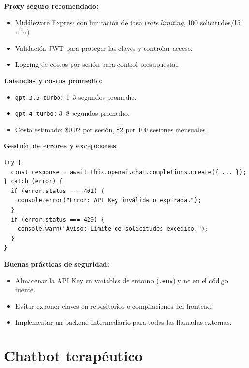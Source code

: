\documentclass[12pt,a4paper]{report}
\numberwithin{figure}{section}
\begin{document}
\vspace{0.5em}
\noindent \textbf{Proxy seguro recomendado:}
\begin{itemize}
  \item Middleware Express con limitación de tasa (\textit{rate limiting}, 100 solicitudes/15 min).
  \item Validación JWT para proteger las claves y controlar acceso.
  \item Logging de costos por sesión para control presupuestal.
\end{itemize}

\vspace{0.5em}
\noindent \textbf{Latencias y costos promedio:}
\begin{itemize}
  \item \texttt{gpt-3.5-turbo:} 1–3 segundos promedio.
  \item \texttt{gpt-4-turbo:} 3–8 segundos promedio.
  \item Costo estimado: \$0.02 por sesión, \$2 por 100 sesiones mensuales.
\end{itemize}

\vspace{0.5em}
\noindent \textbf{Gestión de errores y excepciones:}
\begin{lstlisting}[style=angelcode,caption={Manejo de errores comunes en la conexión con OpenAI}]
try {
  const response = await this.openai.chat.completions.create({ ... });
} catch (error) {
  if (error.status === 401) {
    console.error("Error: API Key inválida o expirada.");
  }
  if (error.status === 429) {
    console.warn("Aviso: Límite de solicitudes excedido.");
  }
}
\end{lstlisting}

\vspace{0.5em}
\noindent \textbf{Buenas prácticas de seguridad:}
\begin{itemize}
  \item Almacenar la API Key en variables de entorno (\texttt{.env}) y no en el código fuente.
  \item Evitar exponer claves en repositorios o compilaciones del frontend.
  \item Implementar un backend intermediario para todas las llamadas externas.
\end{itemize}


\section{Chatbot terapéutico}
\label{sec:chatbot_terapéutico}
\end{document}
